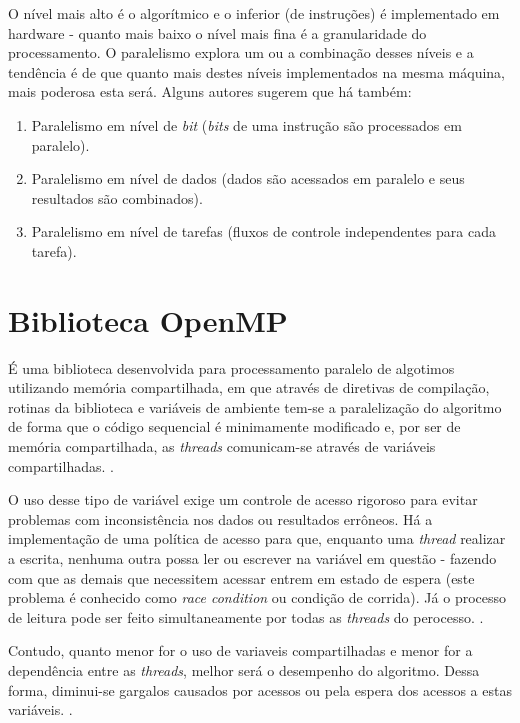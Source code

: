 O nível mais alto é o algorítmico e o inferior (de instruções) é implementado em hardware - quanto mais baixo o nível mais fina é a granularidade do processamento. O paralelismo explora um ou a combinação desses níveis e a tendência é de que quanto mais destes níveis implementados na mesma máquina, mais poderosa esta será. Alguns autores sugerem que há também:

\begin{enumerate}
\item Paralelismo em nível de \textit{bit} (\textit{bits} de uma instrução são processados em paralelo).
	
\item Paralelismo em nível de dados (dados são acessados em paralelo e seus resultados são combinados).

\item Paralelismo em nível de tarefas (fluxos de controle independentes para cada tarefa).
\end{enumerate}

\section{Biblioteca OpenMP}
\label{secao:openmp}

É uma biblioteca desenvolvida para processamento paralelo de algotimos utilizando memória compartilhada, em que através de diretivas de compilação, rotinas da biblioteca e variáveis de ambiente tem-se a paralelização do algoritmo de forma que o código sequencial é minimamente modificado e, por ser de memória compartilhada, as \textit{threads} comunicam-se através de variáveis compartilhadas. \cite{rodrigues:2012:proposta}.

O uso desse tipo de variável exige um controle de acesso rigoroso para evitar problemas com inconsistência nos dados ou resultados errôneos. Há a implementação de uma política de acesso para que, enquanto uma \textit{thread} realizar a escrita, nenhuma outra possa ler ou escrever na variável em questão - fazendo com que as demais que necessitem acessar entrem em estado de espera (este problema é conhecido como \textit{race condition} ou condição de corrida). Já o processo de leitura pode ser feito simultaneamente por todas as \textit{threads} do perocesso. \cite{openmp:2011:application}. 

Contudo, quanto menor for o uso de variaveis compartilhadas e menor for a dependência entre as \textit{threads}, melhor será o desempenho do algoritmo. Dessa forma, diminui-se gargalos causados por acessos ou pela espera dos acessos a estas variáveis. \cite{rodrigues:2012:proposta}.
